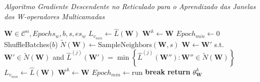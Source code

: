 \begin{algorithm}
    \caption{\textit{Algoritmo Gradiente Descendente no Reticulado para o Aprendizado das Janelas dos W-operadores Multicamadas}}\label{alg:graddescjan}
    \begin{algorithmic}[1]
        \Ensure $ \textbf{W} \in \mathscr{C}^{n},  Epochs_{w}, b, s, es_w $
        \State $L_{v_{min}}\leftarrow \hat{L} \left( \textbf{W} \right)$
        \State $\textbf{W}^{\mathbb{A}} \gets \textbf{W}$
        \State $Epoch_{min} \leftarrow 0$
            \State ShuffleBatches($b$)
                \State $\tilde{N} \left(\textbf{W}\right) \leftarrow \text{SampleNeighbors}\left(\textbf{W},s\right)$
                \State $\textbf{W} \leftarrow \textbf{W}'$ s.t. $\textbf{W}' \in \tilde{N}\left(\textbf{W}\right)$ and $ \hat{L}^{\left(j\right)} \left( \textbf{W}' \right) = \min \left\{  \hat{L}^{\left(j\right)} \left( \textbf{W}'' \right): \textbf{W}'' \in \tilde{N}\left(\textbf{W}\right) \right\} $
            \EndFor
                \State $L_{v_{min}}\leftarrow  \hat{L} \left( \textbf{W} \right)$
                \State $\textbf{W}^{\mathbb{A}} \gets \textbf{W}$
                \State $Epoch_{min} \leftarrow \text{run}$
            \EndIf
                \State \textbf{break}
            \EndIf
        \EndFor
        \State \textbf{return} $\theta_{\textbf{W}}^{\mathbb{A}}$
    \end{algorithmic}
\end{algorithm}

